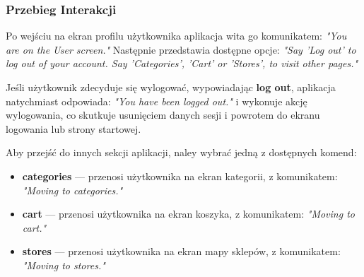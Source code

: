 \subsubsection{Przebieg Interakcji}
Po wejściu na ekran profilu użytkownika aplikacja wita go komunikatem: \textit{"You are on the User screen."} Następnie przedstawia dostępne opcje: \textit{"Say 'Log out' to log out of your account. Say 'Categories', 'Cart' or 'Stores', to visit other pages."}

Jeśli użytkownik zdecyduje się wylogować, wypowiadając \textbf{log out}, aplikacja natychmiast odpowiada: \textit{"You have been logged out."} i wykonuje akcję wylogowania, co skutkuje usunięciem danych sesji i powrotem do ekranu logowania lub strony startowej.

Aby przejść do innych sekcji aplikacji, naley wybrać jedną z dostępnych komend:
\begin{itemize}
    \item \textbf{categories} — przenosi użytkownika na ekran kategorii, z komunikatem: \textit{"Moving to categories."}
    \item \textbf{cart} — przenosi użytkownika na ekran koszyka, z komunikatem: \textit{"Moving to cart."}
    \item \textbf{stores} — przenosi użytkownika na ekran mapy sklepów, z komunikatem: \textit{"Moving to stores."}
\end{itemize}
